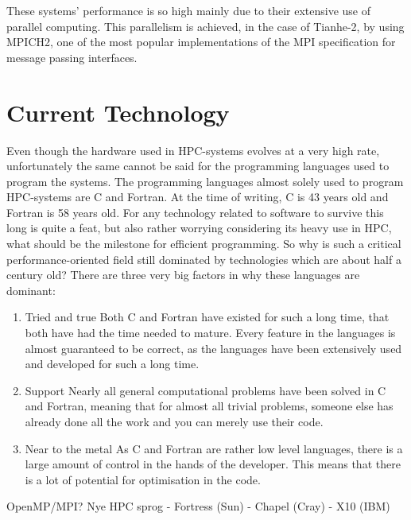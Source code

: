 These systems' performance is so high mainly due to their extensive use of parallel computing. This parallelism is achieved, in the case of Tianhe-2, by using MPICH2, one of the most popular implementations of the MPI specification for message passing interfaces.

\section{Current Technology}
Even though the hardware used in HPC-systems evolves at a very high rate, unfortunately the same cannot be said for the programming languages used to program the systems. The programming languages almost solely used to program HPC-systems are C and Fortran. At the time of writing, C is 43 years old and Fortran is 58 years old. For any technology related to software to survive this long is quite a feat, but also rather worrying considering its heavy use in HPC, what should be the milestone for efficient programming. 
So why is such a critical performance-oriented field still dominated by technologies which are about half a century old? There are three very big factors in why these languages are dominant:
\begin{enumerate}
	\item Tried and true
	Both C and Fortran have existed for such a long time, that both have had the time needed to mature. Every feature in the languages is almost guaranteed to be correct, as the languages have been extensively used and developed for such a long time.
	\item Support
	Nearly all general computational problems have been solved in C and Fortran, meaning that for almost all trivial problems, someone else has already done all the work and you can merely use their code.
	\item Near to the metal
	As C and Fortran are rather low level languages, there is a large amount of control in the hands of the developer. This means that there is a lot of potential for optimisation in the code.
\end{enumerate}

OpenMP/MPI?
Nye HPC sprog
 - Fortress (Sun)
 - Chapel (Cray)
 - X10 (IBM)